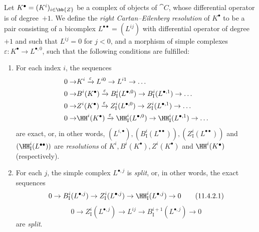\begin{env}[11.4.2]
\label{0.11.4.2}
Let $K^\bullet = (K^i)_{i\in\bb{Z}}$ be a complex of objects of $\cat{C}$, whose differential operator is of degree~$+1$.
We define the \emph{right Cartan--Eilenberg resolution} of $K^\bullet$ to be a pair consisting of a bicomplex $L^{\bullet\bullet} = (L^{ij})$ with differential operator of degree~$+1$ and such that $L^{ij}=0$ for $j<0$, and a morphism of simple complexes $\varepsilon: K^\bullet \rightarrow L^{\bullet, 0}$, such that the following conditions are fulfilled:
\begin{enumerate}
  \item[(i)] For each index $i$, the sequences
    \[
      \begin{aligned}
        0 \rightarrow
        & K^i
        \xrightarrow{\varepsilon} L^{i0}
        \rightarrow L^{i1}
        \rightarrow \ldots
      \\0 \rightarrow
        & B^i(K^\bullet)
        \xrightarrow{\varepsilon} B_\mathrm{I}^i(L^{\bullet,0})
        \rightarrow B_\mathrm{I}^i(L^{\bullet,1})
        \rightarrow \ldots
      \\0 \rightarrow
        & Z^i(K^\bullet)
        \xrightarrow{\varepsilon} Z_\mathrm{I}^i(L^{\bullet,0})
        \rightarrow Z_\mathrm{I}^i(L^{\bullet,1})
        \rightarrow \ldots
      \\0 \rightarrow
        & \HH^i(K^\bullet)
        \xrightarrow{\varepsilon} \HH_\mathrm{I}^i(L^{\bullet,0})
        \rightarrow \HH_\mathrm{I}^i(L^{\bullet,1})
        \rightarrow \ldots
      \end{aligned}
    \]
    are exact, or, in other words, $(L^{i,\bullet}), (B_\mathrm{I}^i(L^{\bullet\bullet})), (Z_\mathrm{I}^i(L^{\bullet\bullet}))$ and $(\HH_\mathrm{I}^i(L^{\bullet\bullet}))$ are \emph{resolutions} of $K^i, B^i(K^\bullet), Z^i(K^\bullet)$ and $\HH^i(K^\bullet)$ (respectively).
  \item[(ii)] For each $j$, the simple complex $L^{\bullet, j}$ is \emph{split}, or, in other words, the exact sequences
    \[
      \label{0.11.4.2.1}
      0 \rightarrow B_\mathrm{I}^i(L^{\bullet,j}) \rightarrow Z_\mathrm{I}^i(L^{\bullet,j}) \rightarrow \HH_\mathrm{I}^i(L^{\bullet,j}) \rightarrow 0
      \tag{11.4.2.1}
    \]
    \[
      \label{0.11.4.2.2}
      0 \rightarrow Z_\mathrm{I}^i(L^{\bullet,j}) \rightarrow L^{ij} \rightarrow B_\mathrm{I}^{i+1}(L^{\bullet,j}) \rightarrow 0
      \tag{11.4.2.2}
    \]
    are \emph{split}.
\end{enumerate}


\end{env}
